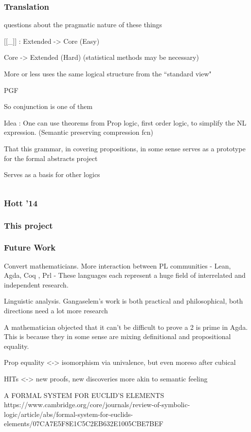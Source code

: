\documentclass[10pt]{beamer}
\begin{document}
\begin{frame}
\frametitle{Translation}

questions about the pragmatic nature of these things

[[_]] : Extended -> Core  (Easy)


Core -> Extended  (Hard)
(statistical methods may be necessary)

More or less uses the same logical structure from the ``standard view"

PGF

So conjunction is one of them


Idea : One can use theorems from Prop logic, first order logic, to simplify the
NL expression.  (Semantic preserving compression fcn)

That this grammar, in covering propositions, in some sense serves as a prototype
for the formal abstracts project

Serves as a basis for other logics

\end{frame}


\begin{frame}

\begin{verbatim}

\end{verbatim}


\end{frame}

\begin{frame}
\frametitle{Hott '14}

\end{frame}

\begin{frame}
\frametitle{This project}

\end{frame}

\begin{frame}
\frametitle{Future Work}

Convert mathematicians.
More interaction between PL communities - Lean, Agda, Coq , {Prl} -
These languages each represent a  huge field of interrelated and independent research. 

Linguistic analysis.  Gangaselem's work is both practical and philosophical,
both directions need a lot more research

A mathematician objected that it can't be difficult to prove a 2 is prime in
Agda. This is because they in some sense are mixing definitional and
propositional equality.

Prop equality <-> isomorphism via univalence, but even moreso after cubical

HITs <-> new proofs, new discoveries more akin to semantic feeling 

A FORMAL SYSTEM FOR EUCLID’S ELEMENTS
https://www.cambridge.org/core/journals/review-of-symbolic-logic/article/abs/formal-system-for-euclids-elements/07CA7E5F8E1C5C2EB632E1005CBE7BEF

\end{frame}
\end{document}
